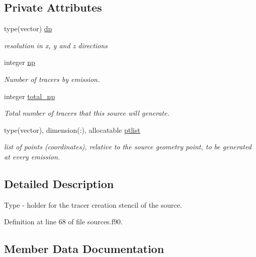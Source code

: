 \subsection*{Private Attributes}
\begin{DoxyCompactItemize}
\item 
type(vector) \mbox{\hyperlink{structsources__mod_1_1source__stencil_af97e78ed335c0a3509cb397ba7ad2f25}{dp}}
\begin{DoxyCompactList}\small\item\em resolution in x, y and z directions \end{DoxyCompactList}\item 
integer \mbox{\hyperlink{structsources__mod_1_1source__stencil_a11ed46a8e923b5902cc02420d88158c5}{np}}
\begin{DoxyCompactList}\small\item\em Number of tracers by emission. \end{DoxyCompactList}\item 
integer \mbox{\hyperlink{structsources__mod_1_1source__stencil_ad7373d51bdf50a4595b6c0fa69f7f915}{total\+\_\+np}}
\begin{DoxyCompactList}\small\item\em Total number of tracers that this source will generate. \end{DoxyCompactList}\item 
type(vector), dimension(\+:), allocatable \mbox{\hyperlink{structsources__mod_1_1source__stencil_a154e50e2872650da574d0a1148e3065a}{ptlist}}
\begin{DoxyCompactList}\small\item\em list of points (coordinates), relative to the source geometry point, to be generated at every emission. \end{DoxyCompactList}\end{DoxyCompactItemize}


\subsection{Detailed Description}
Type -\/ holder for the tracer creation stencil of the source. 

Definition at line 68 of file sources.\+f90.



\subsection{Member Data Documentation}
\mbox{\label{structsources__mod_1_1source__stencil_af97e78ed335c0a3509cb397ba7ad2f25}} 
